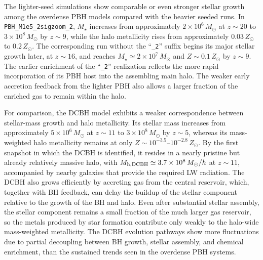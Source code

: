\documentclass[twocolumn,trackchanges]{aastex701}
\begin{document}
The lighter-seed simulations show comparable or even stronger stellar growth among the overdense PBH models compared with the heavier seeded runs. In \texttt{PBH\_M1e5\_2sigzoom\_2}, $M_\star$ increases from approximately $2\times10^6\,M_\odot$ at $z\sim20$ to $3\times10^8\,M_\odot$ by $z\sim9$, while the halo metallicity rises from approximately $0.03\,Z_\odot$ to $0.2\,Z_\odot$. The corresponding run without the ``\texttt{\_2}'' suffix begins its major stellar growth later, at $z\sim16$, and reaches $M_\star\simeq 2\times10^7\,M_\odot$ and $Z\sim0.1\,Z_\odot$ by $z\sim9$. The earlier enrichment of the ``\texttt{\_2}'' realization reflects the more rapid incorporation of its PBH host into the assembling main halo. The weaker early accretion feedback from the lighter PBH also allows a larger fraction of the enriched gas to remain within the halo.

For comparison, the DCBH model \citep[case C of][]{JeonSMBH2025ApJ...979..127J} exhibits a weaker correspondence between stellar-mass growth and halo metallicity. Its stellar mass increases from approximately $5\times10^6\,M_\odot$ at $z\sim11$ to $3\times10^8\,M_\odot$ by $z\sim5$, whereas its mass-weighted halo metallicity remains at only $Z\sim10^{-3.5}$--$10^{-2.8}\,Z_\odot$. By the first snapshot in which the DCBH is identified, it resides in a nearly pristine but already relatively massive halo, with $M_{\rm h,DCBH}\simeq3.7\times10^8\,M_\odot/h$ at $z\sim11$, accompanied by nearby galaxies that provide the required LW radiation. The DCBH also grows efficiently by accreting gas from the central reservoir, which, together with BH feedback, can delay the buildup of the stellar component relative to the growth of the BH and halo. Even after substantial stellar assembly, the stellar component remains a small fraction of the much larger gas reservoir, so the metals produced by star formation contribute only weakly to the halo-wide mass-weighted metallicity. The DCBH evolution pathways show more fluctuations due to partial decoupling between BH growth, stellar assembly, and chemical enrichment, than the sustained
trends seen in the overdense PBH systems.
\end{document}
